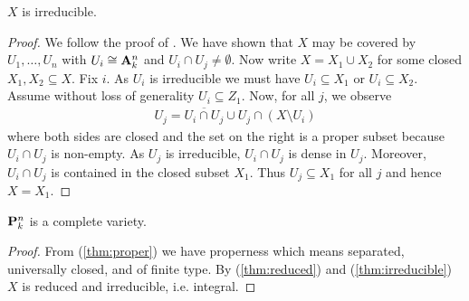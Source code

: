 \documentclass{article}
\begin{document}
\begin{theorem}\label{thm:irreducible}
  $X$ is irreducible.
  \begin{proof}
    We follow the proof of \cite[\href{https://stacks.math.columbia.edu/tag/01OL}{Tag 01OL}]{stacks-project}.
    We have shown that $X$ may be covered by $U_1,\ldots,U_n$ with
    $U_i \cong \mathbf{A}^{n}_{k}$ and $U_i\cap U_j\neq\emptyset$. Now write
    $X=X_1 \cup X_2$ for some closed $X_1,X_2\subseteq X$.
    Fix $i$. As $U_i$ is irreducible we must have
    $U_i\subseteq X_1$ or $U_i\subseteq X_2$. Assume without loss
    of generality $U_i\subseteq Z_1$. Now, for all $j$,
    we observe
    \begin{align*}
      U_j = \overline{U_i\cap U_j}\cup U_j\cap(X\setminus U_i)
    \end{align*}
    where both sides are closed and the set on the right is a proper
    subset because $U_i\cap U_j$ is non-empty. As $U_j$ is irreducible,
    $U_i\cap U_j$ is dense in $U_j$. Moreover, $U_i \cap U_j$ is
    contained in the closed subset $X_1$. Thus $U_j\subseteq X_1$
    for all $j$ and hence $X=X_1$.
  \end{proof}
\end{theorem}

\begin{corollary}
  $\mathbf{P}^{n}_{k}$ is a complete variety.
  \begin{proof}
    From (\ref{thm:proper}) we have properness which means separated,
    universally closed, and of finite type. By (\ref{thm:reduced})
    and (\ref{thm:irreducible}) $X$ is reduced and irreducible, i.e.
    integral.
  \end{proof}
\end{corollary}

\printbibliography
\end{document}
